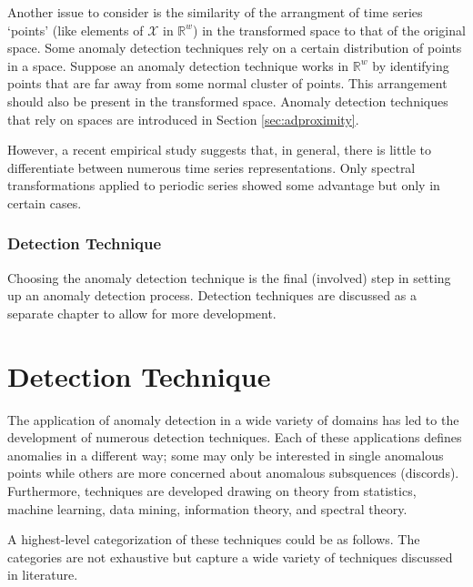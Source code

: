 Another issue to consider is the similarity of the arrangment of time series `points' (like elements of $\mathcal{X}$ in $\mathbb{R}^w$) in the transformed space to that of the original space. Some anomaly detection techniques rely on a certain distribution of points in a space. Suppose an anomaly detection technique works in $\mathbb{R}^w$ by identifying points that are far away from some normal cluster of points. This arrangement should also be present in the transformed space. Anomaly detection techniques that rely on spaces are introduced in Section \ref{sec:adproximity}.

However, a recent empirical study \cite{Wang2013} suggests that, in general, there is little to differentiate between numerous time series representations. Only spectral transformations applied to periodic series showed some advantage but only in certain cases.

\subsection{Detection Technique}

Choosing the anomaly detection technique is the final (involved) step in setting up an anomaly detection process. Detection techniques are discussed as a separate chapter to allow for more development.

\chapter{Detection Technique}
\label{ch:adtechnique}

The application of anomaly detection in a wide variety of domains has led to the development of numerous detection techniques. Each of these applications defines anomalies in a different way;  some  may only be interested in single anomalous points while others are more concerned about anomalous subsquences (discords). Furthermore, techniques are developed drawing on theory from statistics, machine learning, data mining, information theory, and spectral theory.

A highest-level categorization of these techniques could be as follows. The categories are not exhaustive but capture a wide variety of techniques discussed in literature.


